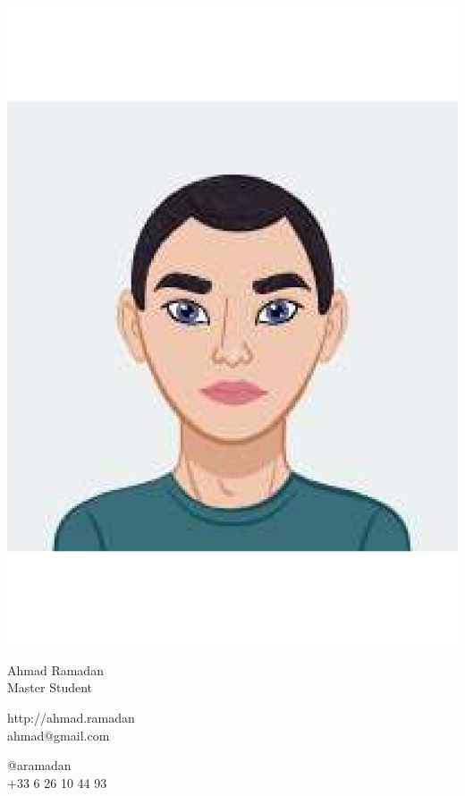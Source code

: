 \documentclass{article}
\begin{document}
\centering \includegraphics[width=.25\linewidth]{logo}\\[5pt]
\parbox{2in}{\Large \centering Ahmad Ramadan\\[1pt]
\normalsize Master Student}

\vfill
\raggedright
\begin{multicols}{2}
http://ahmad.ramadan\\
ahmad@gmail.com

\columnbreak
\raggedleft
@aramadan\\
+33 6 26 10 44 93%
\end{multicols}%
\end{document}

